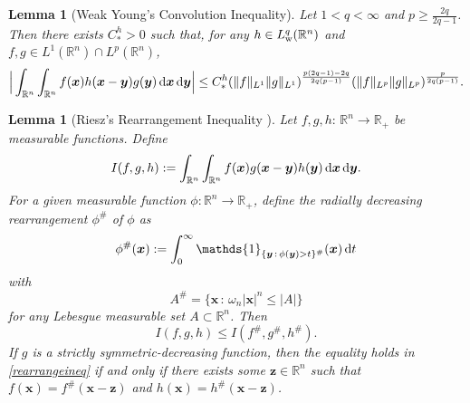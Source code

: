 \documentclass[reqno,11pt]{amsart}
\numberwithin{equation}{section}
\newtheorem{lemma}[theorem]{Lemma}
\theoremstyle{definition}
\def\dd{{\, \rm d}}
\begin{document}
\begin{lemma}[Weak Young's Convolution Inequality]\label{precised}
	Let $1 < q < \infty$ and $p \geq \frac{2q}{2q-1}$. 
    Then there exists $C_*^h> 0$ such that, for any $h \in L^q_{\rm w}(\mathbb{R}^n)$ 
    and $f,g \in L^1(\mathbb{R}^n) \cap L^p(\mathbb{R}^n)$,
	\[
	\Big| \int_{\mathbb{R}^n} \int_{\mathbb{R}^n} f(\boldsymbol{x}) h(\boldsymbol{x} - \boldsymbol{y}) g(\boldsymbol{y}) \dd \boldsymbol{x} \dd \boldsymbol{y} \Big| 
    \leq C_*^h (\|f\|_{L^1}\|g\|_{L^1})^\frac{p(2q-1)-2q}{2q(p-1)} (\|f\|_{L^p}\|g\|_{L^p})^\frac{p}{2q(p-1)}.
	\]
\end{lemma}

\begin{lemma}[Riesz's Rearrangement Inequality \cite{Lieb_2001}]
    Let $f, g, h:\,\mathbb{R}^n \to \mathbb{R}_+$ be measurable functions. Define
    \[
    I(f,g,h) := \int_{\mathbb{R}^n} \int_{\mathbb{R}^n} f(\boldsymbol{x}) g(\boldsymbol{x} - \boldsymbol{y}) h(\boldsymbol{y}) \dd \boldsymbol{x} \dd \boldsymbol{y}.
    \]
    For a given measurable function $\phi : \mathbb{R}^n \to \mathbb{R}_+$, define the radially decreasing rearrangement $\phi^{\#}$ of $\phi$ as
    \begin{equation*}
    \phi^{\#} (\boldsymbol{x}) := \int^\infty_0 \mathds{1}_{\{\boldsymbol{y} \, : \, \phi(\boldsymbol{y}) > t\}^{\#}} (\boldsymbol{x}) \dd t
    \end{equation*}
    with
    \[
    A^{\#} = \{ \boldsymbol{x} \, : \, \omega_n |\boldsymbol{x}|^n \leq |A|\}
    \]
    for any Lebesgue measurable set $A \subset \mathbb{R}^n$. Then
    \begin{equation}\label{rearrangeineq}
    I(f,g,h) \leq I(f^{\#},g^{\#},h^{\#}).
    \end{equation}
    If $g$ is a strictly symmetric-decreasing function, then the equality holds in \eqref{rearrangeineq}
    if and only if there exists some $\boldsymbol{z} \in \mathbb{R}^n$ such that $f(\boldsymbol{x}) = f^{\#}(\boldsymbol{x} - \boldsymbol{z})$ and $h(\boldsymbol{x}) = h^{\#}(\boldsymbol{x} - \boldsymbol{z})$.
\end{lemma}
\end{document}
